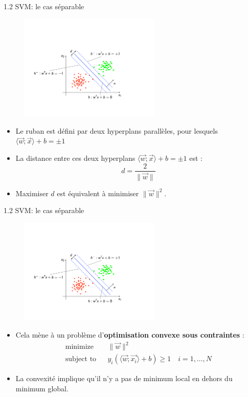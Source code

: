 \begin{frame}{1.2 SVM: le cas séparable}
  \begin{figure}[htb]
    \includegraphics[width=0.6\textwidth]{figures/SVM2.pdf}
  \end{figure}
  \begin{itemize}
    \item Le ruban est défini par deux hyperplans parallèles, pour lesquels $\langle \overrightarrow{w};\overrightarrow{x} \rangle + b = \pm 1$ 
    \item La distance entre ces deux hyperplans $\langle \overrightarrow{w};\overrightarrow{x} \rangle + b = \pm 1$ est : 
    \begin{equation}
      d = \frac{2}{\|\overrightarrow{w}\|}
    \end{equation}
    \item Maximiser $d$ est équivalent à minimiser $\|\overrightarrow{w}\|^2$.
  \end{itemize}
\end{frame}


\begin{frame}{1.2 SVM: le cas séparable}
  \begin{figure}[htb]
    \includegraphics[width=0.6\textwidth]{figures/SVM2.pdf}
  \end{figure}
  \begin{itemize}
    \item Cela mène à un problème d'\textbf{optimisation convexe sous contraintes} : 
    \begin{eqnarray*}
      \mbox{minimize} & & \|\overrightarrow{w}\|^2 \\
      \mbox{subject to} & & y_i(\langle \overrightarrow{w};\overrightarrow{x_i} \rangle + b) \geq 1 \quad i = 1, \ldots, N
    \end{eqnarray*}
    \item La convexité implique qu'il n'y a pas de minimum local en dehors du minimum global. 
  \end{itemize}
\end{frame}


